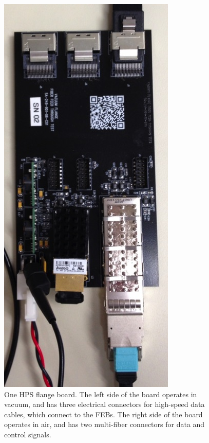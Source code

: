 \begin{figure}[ht]
    \includegraphics[angle=90,width=\textwidth]{detector/figs/flangeboard}
    \caption{One HPS flange board. The left side of the board operates in vacuum, and has three electrical connectors for high-speed data cables, which connect to the FEBs. The right side of the board operates in air, and has two multi-fiber connectors for data and control signals.}
    \label{fig:flangeboard}
\end{figure}

